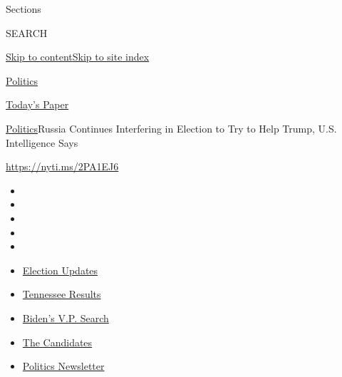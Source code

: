 Sections

SEARCH

\protect\hyperlink{site-content}{Skip to
content}\protect\hyperlink{site-index}{Skip to site index}

\href{https://www.nytimes3xbfgragh.onion/section/politics}{Politics}

\href{https://myaccount.nytimes3xbfgragh.onion/auth/login?response_type=cookie\&client_id=vi}{}

\href{https://www.nytimes3xbfgragh.onion/section/todayspaper}{Today's
Paper}

\href{/section/politics}{Politics}\textbar{}Russia Continues Interfering
in Election to Try to Help Trump, U.S. Intelligence Says

\href{https://nyti.ms/2PA1EJ6}{https://nyti.ms/2PA1EJ6}

\begin{itemize}
\item
\item
\item
\item
\item
\end{itemize}

\begin{itemize}
\item
  \href{https://www.nytimes3xbfgragh.onion/2020/08/07/us/elections/biden-vs-trump.html?action=click\&pgtype=Article\&state=default\&region=TOP_BANNER\&context=storylines_menu}{Election
  Updates}
\item
  \href{https://www.nytimes3xbfgragh.onion/interactive/2020/08/06/us/elections/results-tennessee-primary-elections.html?action=click\&pgtype=Article\&state=default\&region=TOP_BANNER\&context=storylines_menu}{Tennessee
  Results}
\item
  \href{https://www.nytimes3xbfgragh.onion/article/biden-vice-president-2020.html?action=click\&pgtype=Article\&state=default\&region=TOP_BANNER\&context=storylines_menu}{Biden's
  V.P. Search}
\item
  \href{https://www.nytimes3xbfgragh.onion/interactive/2019/us/politics/2020-presidential-candidates.html?action=click\&pgtype=Article\&state=default\&region=TOP_BANNER\&context=storylines_menu}{The
  Candidates}
\item
  \href{https://www.nytimes3xbfgragh.onion/newsletters/politics?action=click\&pgtype=Article\&state=default\&region=TOP_BANNER\&context=storylines_menu}{Politics
  Newsletter}
\end{itemize}

